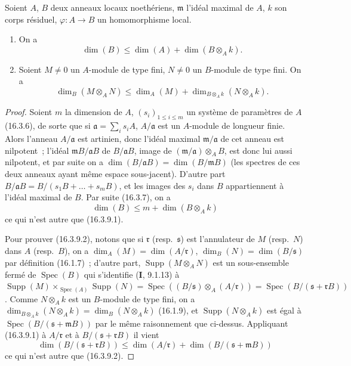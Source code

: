 \begin{proposition}[16.3.9]
\label{0.16.3.9-fr}
Soient $A$, $B$ deux anneaux locaux noethériens, $\mathfrak{m}$ l'idéal maximal
de $A$, $k$ son corps résiduel, $\varphi:A\to B$ un homomorphisme local.
\begin{enumerate}
  \item[\rm{(i)}] On a
  \begin{equation}
  \label{0.16.3.9.1-fr}
  \tag{16.3.9.1}
    \dim(B)\leq\dim(A)+\dim(B\otimes_A k).
  \end{equation}
  \item[\rm{(ii)}] Soient $M\neq0$ un $A$-module de type fini, $N\neq0$ un
  $B$-module de type fini. On a
  \begin{equation}
  \label{0.16.3.9.2-fr}
  \tag{16.3.9.2}
    \dim_B(M\otimes_A N)
    \leq\dim_A(M)+\dim_{B\otimes_A k}(N\otimes_A k).
  \end{equation}
\end{enumerate}
\end{proposition}

\begin{proof}
Soient $m$ la dimension de $A$, $(s_i)_{1\leq i\leq m}$ un système de
paramètres de $A$ (16.3.6), de sorte que si
$\mathfrak{a}=\sum_i s_iA$, $A/\mathfrak{a}$ est un $A$-module de longueur
finie. Alors l'anneau $A/\mathfrak{a}$ est artinien, donc l'idéal maximal
$\mathfrak{m}/\mathfrak{a}$ de cet anneau est nilpotent~; l'idéal
$\mathfrak{m}B/\mathfrak{a}B$ de $B/\mathfrak{a}B$, image de
$(\mathfrak{m}/\mathfrak{a})\otimes_A B$, est donc lui aussi nilpotent, et par
suite on a
$\dim(B/\mathfrak{a}B)=\dim(B/\mathfrak{m}B)$ (les spectres de ces deux
anneaux ayant même espace sous-jacent). D'autre part
$B/\mathfrak{a}B=B/(s_1B+\ldots+s_mB)$, et les images des $s_i$ dans $B$
appartiennent à l'idéal maximal de $B$. Par suite (16.3.7), on a
\[
  \dim(B)\leq m+\dim(B\otimes_A k)
\]
ce qui n'est autre que (16.3.9.1).

Pour prouver (16.3.9.2), notons que si $\mathfrak{r}$ (resp.~$\mathfrak{s}$)
est l'annulateur de $M$ (resp.~$N$)
dans $A$ (resp.~$B$), on a
$\dim_A(M)=\dim(A/\mathfrak{r})$, $\dim_B(N)=\dim(B/\mathfrak{s})$ par
définition (16.1.7)~; d'autre part, $\operatorname{Supp}(M\otimes_A N)$ est un
sous-ensemble fermé de $\operatorname{Spec}(B)$ qui s'identifie (\textbf{I}, 9.1.13) à
$\operatorname{Supp}(M)\times_{\operatorname{Spec}(A)}\operatorname{Supp}(N)=\operatorname{Spec}((B/\mathfrak{s})\otimes_A(A/\mathfrak{r}))=\operatorname{Spec}(B/(\mathfrak{s}+\mathfrak{r}B))$.
Comme $N\otimes_A k$ est un $B$-module de type fini, on a
$\dim_{B\otimes_A k}(N\otimes_A k)=\dim_B(N\otimes_A k)$ (16.1.9), et
$\operatorname{Supp}(N\otimes_A k)$ est égal à
$\operatorname{Spec}(B/(\mathfrak{s}+\mathfrak{m}B))$ par le même raisonnement
que ci-dessus. Appliquant (16.3.9.1) à $A/\mathfrak{r}$ et à
$B/(\mathfrak{s}+\mathfrak{r}B)$ il vient
\[
  \dim(B/(\mathfrak{s}+\mathfrak{r}B))
  \leq\dim(A/\mathfrak{r})+
  \dim(B/(\mathfrak{s}+\mathfrak{m}B))
\]
ce qui n'est autre que (16.3.9.2).
\end{proof}

